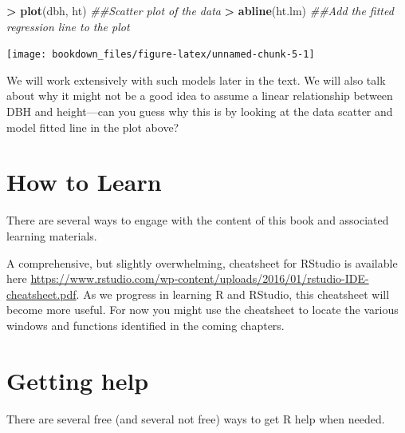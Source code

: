 \documentclass[]{krantz}
\makeatletter
\newenvironment{Shaded}{\begin{snugshade}}{\end{snugshade}}
\newcommand{\CommentTok}[1]{\textcolor[rgb]{0.37,0.37,0.37}{\textit{#1}}}
\newcommand{\KeywordTok}[1]{\textcolor[rgb]{0.27,0.27,0.27}{\textbf{#1}}}
\newcommand{\NormalTok}[1]{#1}
\newcommand{\OperatorTok}[1]{\textcolor[rgb]{0.43,0.43,0.43}{\textbf{#1}}}
\newcommand{\StringTok}[1]{\textcolor[rgb]{0.5,0.5,0.5}{#1}}
\newenvironment{kframe}{%
\medskip{}
\setlength{\fboxsep}{.8em}
 \def\at@end@of@kframe{}%
 \ifinner\ifhmode%
  \def\at@end@of@kframe{\end{minipage}}%
  \begin{minipage}{\columnwidth}%
 \fi\fi%
 \def\FrameCommand##1{\hskip\@totalleftmargin \hskip-\fboxsep
 \colorbox{shadecolor}{##1}\hskip-\fboxsep
     \hskip-\linewidth \hskip-\@totalleftmargin \hskip\columnwidth}%
 \MakeFramed {\advance\hsize-\width
   \@totalleftmargin\z@ \linewidth\hsize
   \@setminipage}}%
 {\par\unskip\endMakeFramed%
 \at@end@of@kframe}
\renewenvironment{Shaded}{\begin{kframe}}{\end{kframe}}
\makeatother
\begin{document}
\begin{Shaded}
\begin{Highlighting}[]
\OperatorTok{>}\StringTok{ }\KeywordTok{plot}\NormalTok{(dbh, ht)  }\CommentTok{##Scatter plot of the data}
\OperatorTok{>}\StringTok{ }\KeywordTok{abline}\NormalTok{(ht.lm)  }\CommentTok{##Add the fitted regression line to the plot}
\end{Highlighting}
\end{Shaded}

\begin{center}\texttt{[image: bookdown\_files/figure-latex/unnamed-chunk-5-1]} \end{center}

We will work extensively with such models later in the text. We will also talk about why it might not be a good idea to assume a linear relationship between DBH and height---can you guess why this is by looking at the data scatter and model fitted line in the plot above?

\hypertarget{how-to-learn}{%
\section{How to Learn}\label{how-to-learn}}

There are several ways to engage with the content of this book and associated learning materials.

A comprehensive, but slightly overwhelming, cheatsheet for RStudio is available here \url{https://www.rstudio.com/wp-content/uploads/2016/01/rstudio-IDE-cheatsheet.pdf}. As we progress in learning R and RStudio, this cheatsheet will become more useful. For now you might use the cheatsheet to locate the various windows and functions identified in the coming chapters.

\hypertarget{getting-help}{%
\section{Getting help}\label{getting-help}}

There are several free (and several not free) ways to get R help when needed.
\end{document}
